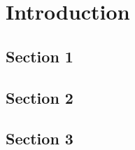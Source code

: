\chapter{Introduction}
  \label{introduction}

  \section{Section 1}
    \label{section1}
    

  \section{Section 2}
    \label{section_2}
    

  \section{Section 3}
    \label{section_3} 
    

